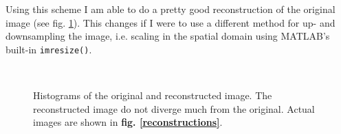 \documentclass[a4paper, 10pt, final]{article}
\begin{document}
Using this scheme I am able to do a pretty good reconstruction of the
original image (see fig. \ref{comparison}).  This changes if I were to
use a different method for up- and downsampling the image, i.e. scaling
in the spatial domain using MATLAB's built-in \texttt{imresize()}.

\begin{figure}[!h]
    \centering
    \hspace{1em}
    \\
    \caption{Histograms of the original and reconstructed image.
    The reconstructed image do not diverge much from the original.
    Actual images are shown in \textbf{fig. \ref{reconstructions}}.}
    \label{comparison}
\end{figure}
\end{document}
